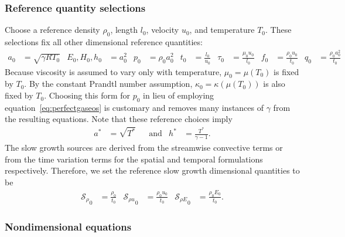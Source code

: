 \documentclass[letterpaper,11pt,nointlimits,reqno,draft]{amsart}
\newcommand{\Ssd}{\ensuremath{\mathcal{S}}} %
\begin{document}
\subsubsection{Reference quantity selections}
\label{sec:nondimrefq}

Choose a reference density $\rho_{0}$, length $l_{0}$, velocity $u_{0}$, and
temperature $T_{0}$.  These selections fix all other dimensional reference
quantities:
\begin{align}
  a_{0} &= \sqrt{\gamma{}RT_{0}}
  &
  E_{0}, H_{0}, h_{0} &= a_{0}^{2}
  &
  p_{0} &= \rho_{0} a_{0}^{2}
  &
  t_{0} &= \frac{l_{0}}{u_{0}}
  &
  \tau_{0} &= \frac{\mu_{0}u_{0}}{l_{0}}
  &
  f_{0} &= \frac{\rho_{0}u_{0}}{t_{0}}
  &
  q_{0} &= \frac{\rho_{0}a_{0}^{2}}{t_{0}}
\end{align}
Because viscosity is assumed to vary only with temperature,
$\mu_{0}=\mu\!\left( T_{0} \right)$ is fixed by $T_{0}$.  By the constant
Prandtl number assumption, $\kappa_{0}=\kappa\!\left( \mu\!\left( T_{0} \right)
\right)$ is also fixed by $T_{0}$.  Choosing this form for $p_{0}$ in lieu of
employing equation~\eqref{eq:perfectgaseos} is customary and removes many
instances of $\gamma$ from the resulting equations.  Note that these reference
choices imply
\begin{align}
a^{*}&=\sqrt{T^{*}}
&
&\text{and}
&
h^{*}&=\frac{T^{*}}{\gamma-1}
.
\end{align}
The slow growth sources are derived from the streamwise convective terms or
from the time variation terms for the spatial and temporal formulations
respectively. Therefore, we set the reference slow growth dimensional quantities
to be
\begin{align}
  {\Ssd_{\rho}}_0 &= \frac{\rho_{0}}{t_0}
  &
  {\Ssd_{\rho u}}_0 &= \frac{\rho_{0} u_0}{t_0}
  &
  {\Ssd_{\rho E}}_0 &= \frac{\rho_{0} E_0}{t_0}.
\end{align}


\subsubsection{Nondimensional equations}
\label{nondim_equations}
\end{document}
